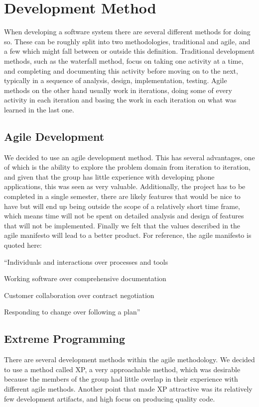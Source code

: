 \section{Development Method}

When developing a software system there are several different methods for doing so. These can be roughly split into two methodologies, traditional and agile, and a few which might fall between or outside this definition. Traditional development methods, such as the waterfall method, focus on taking one activity at a time, and completing and documenting this activity before moving on to the next, typically in a sequence of analysis, design, implementation, testing. Agile methods on the other hand usually work in iterations, doing some of every activity in each iteration and basing the work in each iteration on what was learned in the last one.

\subsection{Agile Development}

We decided to use an agile development method. This has several advantages, one of which is the ability to explore the problem domain from iteration to iteration, and given that the group has little experience with developing phone applications, this was seen as very valuable. Additionally, the project has to be completed in a single semester, there are likely features that would be nice to have but will end up being outside the scope of a relatively short time frame, which means time will not be spent on detailed analysis and design of features that will not be implemented. Finally we felt that the values described in the agile manifesto will lead to a better product. For reference, the agile manifesto is quoted here:

``Individuals and interactions over processes and tools

Working software over comprehensive documentation

Customer collaboration over contract negotiation

Responding to change over following a plan''\cite{shitmanifesto}

\subsection{Extreme Programming}

There are several development methods within the agile methodology. We decided to use a method called \ac{XP}\cite{beck04}, a very approachable method, which was desirable because the members of the group had little overlap in their experience with different agile methods. Another point that made \ac{XP} attractive was its relatively few development artifacts, and high focus on producing quality code.

